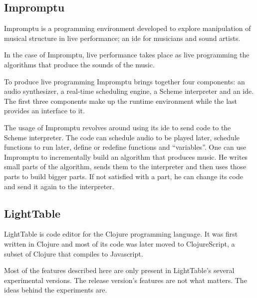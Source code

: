 \documentclass{./llncs2e/llncs}
\begin{document}
\subsection{Impromptu\cite{sorensen2005impromptu}\cite{sorensen2010programming}}
	Impromptu is a programming environment developed to explore manipulation of musical structure in live performance; an \ac{ide} for musicians and sound artists.

	In the case of Impromptu, live performance takes place as live programming the algorithms that produce the sounds of the music.

	To produce live programming Impromptu brings together four components: an audio synthesizer, a real-time scheduling engine, a Scheme interpreter and an \ac{ide}. The first three components make up the runtime environment while the last provides an interface to it. 

	The usage of Impromptu revolves around using its \ac{ide} to send code to the Scheme interpreter. The code can schedule audio to be played later, schedule functions to run later, define or redefine functions and ``variables''. 
	One can use Impromptu to incrementally build an algorithm that produces music. He writes small parts of the algorithm, sends them to the interpreter and then uses those parts to build bigger parts. If not satisfied with a part, he can change its code and send it again to the interpreter.


\subsection{LightTable}
	LightTable is code editor for the Clojure programming language\cite{hickey2008clojure}. It was first written in Clojure and most of its code was later moved to ClojureScript\cite{10.1109/MIC.2011.148}, a subset of Clojure that compiles to Javascript.

	Most of the features described here are only present in LightTable's several experimental versions. The release version's features are not what matters. The ideas behind the experiments are.
\end{document}
